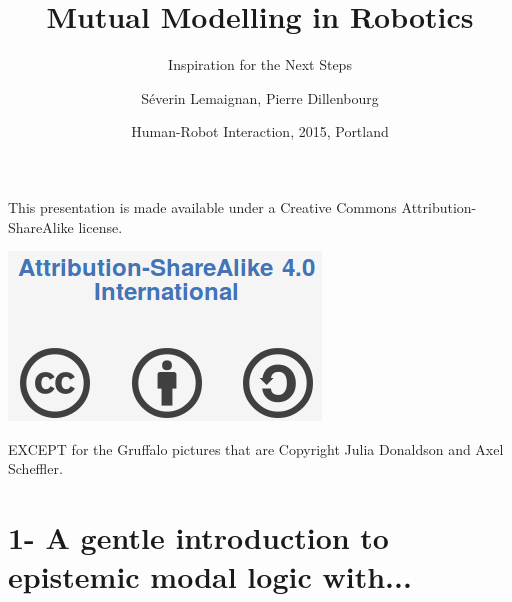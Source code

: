 \documentclass[compress]{beamer}
\title{Mutual Modelling in Robotics}
\subtitle{Inspiration for the Next Steps}
\date{Human-Robot Interaction, 2015, Portland}
\author{\scriptsize {\Medium Séverin Lemaignan}, Pierre Dillenbourg}
\institute{Computer-Human Interaction\\for Learning and Instruction {\Medium
EPFL}}
\begin{document}
\begin{frame}{}
\Large

This presentation is made available under a Creative Commons
Attribution-ShareAlike license.

\begin{center}
    \includegraphics[width=0.8\linewidth]{cc-by-sa}
\end{center}

{\Medium EXCEPT} for the Gruffalo pictures that are Copyright Julia Donaldson
and Axel Scheffler.

\end{frame}

\maketitle


\section{1- A gentle introduction to epistemic modal logic with...}
\end{document}
